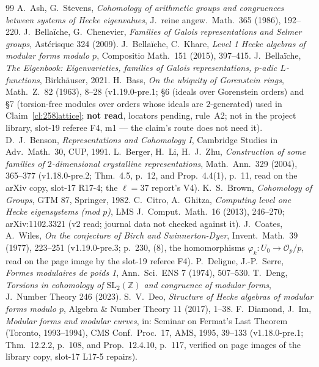 \documentclass[11pt]{article}
\theoremstyle{remark}
\newcommand{\Z}{\mathbb{Z}}
\newcommand{\SL}{\mathrm{SL}}
\begin{document}
\begingroup\small
\begin{thebibliography}{99}
 A.~Ash, G.~Stevens, \emph{Cohomology of arithmetic groups and congruences between systems of Hecke eigenvalues}, J.~reine angew.\ Math.\ 365 (1986), 192--220.
 J.~Bella\"iche, G.~Chenevier, \emph{Families of Galois representations and Selmer groups}, Ast\'erisque 324 (2009).
 J.~Bella\"iche, C.~Khare, \emph{Level 1 Hecke algebras of modular forms modulo $p$}, Compositio Math.\ 151 (2015), 397--415.
 J.~Bella\"iche, \emph{The Eigenbook: Eigenvarieties, families of Galois representations, $p$-adic $L$-functions}, Birkh\"auser, 2021.
 H.~Bass, \emph{On the ubiquity of Gorenstein rings}, Math.\ Z.\ 82 (1963), 8--28 (v1.19.0-pre.1; \S6 (ideals over Gorenstein orders) and \S7
(torsion-free modules over orders whose ideals are $2$-generated) used in Claim~\ref{cl:258lattice}; \textbf{not read}, locators pending, rule~A2; not in the project library, slot-19 referee F4, m1 --- the claim's route does not need it).
 D.~J.~Benson, \emph{Representations and Cohomology I}, Cambridge Studies in Adv.\ Math.\ 30, CUP, 1991.
 L.~Berger, H.~Li, H.~J.~Zhu, \emph{Construction of some families of $2$-dimensional crystalline representations}, Math.\ Ann.\ 329 (2004),
365--377 (v1.18.0-pre.2; Thm.~4.5, p.~12, and Prop.~4.4(1), p.~11, read on the arXiv copy, slot-17 R17-4; the $\ell=37$ report's V4).
 K.~S.~Brown, \emph{Cohomology of Groups}, GTM 87, Springer, 1982.
 C.~Citro, A.~Ghitza, \emph{Computing level one Hecke eigensystems (mod $p$)}, LMS J.\ Comput.\ Math.\ 16 (2013), 246--270; arXiv:1102.3321 (v2 read; journal data not checked against it).
 J.~Coates, A.~Wiles, \emph{On the conjecture of Birch and Swinnerton-Dyer}, Invent.\ Math.\ 39 (1977), 223--251 (v1.19.0-pre.3; p.~230, (8),
the homomorphisms $\varphi_k\colon U_0\to\mathcal O_p/p$, read on the page image by the slot-19 referee F4).
 P.~Deligne, J.-P.~Serre, \emph{Formes modulaires de poids 1}, Ann.\ Sci.\ ENS 7 (1974), 507--530.
 T.~Deng, \emph{Torsions in cohomology of $\SL_2(\Z)$ and congruence of modular forms}, J.~Number Theory 246 (2023).
 S.~V.~Deo, \emph{Structure of Hecke algebras of modular forms modulo $p$}, Algebra \& Number Theory 11 (2017), 1--38.
 F.~Diamond, J.~Im, \emph{Modular forms and modular curves}, in: Seminar on Fermat's Last Theorem (Toronto, 1993--1994), CMS Conf.\ Proc.\ 17, AMS, 1995, 39--133 (v1.18.0-pre.1; Thm.~12.2.2, p.~108, and Prop.~12.4.10, p.~117, verified on page images of the library copy, slot-17 L17-5 repairs).

\end{thebibliography}
\end{document}
